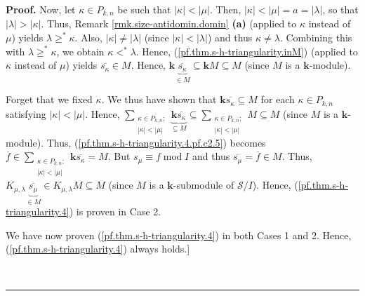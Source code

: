 \documentclass[numbers=enddot,12pt,final,onecolumn,notitlepage]{scrartcl}%
\theoremstyle{definition}
\newenvironment{proof}[1][Proof]{\noindent\textbf{#1.} }{\ \rule{0.5em}{0.5em}}
\let\sumnonlimits\sum
\renewcommand{\sum}{\sumnonlimits\limits}
\begin{document}
\begin{proof}
Now, let $\kappa\in P_{k,n}$ be such that $\left\vert \kappa\right\vert
<\left\vert \mu\right\vert $. Then, $\left\vert \kappa\right\vert <\left\vert
\mu\right\vert =a=\left\vert \lambda\right\vert $, so that $\left\vert
\lambda\right\vert >\left\vert \kappa\right\vert $. Thus, Remark
\ref{rmk.size-antidomin.domin} \textbf{(a)} (applied to $\kappa$ instead of
$\mu$) yields $\lambda\geq^{\ast}\kappa$. Also, $\left\vert \kappa\right\vert
\neq\left\vert \lambda\right\vert $ (since $\left\vert \kappa\right\vert
<\left\vert \lambda\right\vert $) and thus $\kappa\neq\lambda$. Combining this
with $\lambda\geq^{\ast}\kappa$, we obtain $\kappa<^{\ast}\lambda$. Hence,
(\ref{pf.thm.s-h-triangularity.inM}) (applied to $\kappa$ instead of $\mu$)
yields $\overline{s_{\kappa}}\in M$. Hence, $\mathbf{k}\underbrace{\overline
{s_{\kappa}}}_{\in M}\subseteq\mathbf{k}M\subseteq M$ (since $M$ is a
$\mathbf{k}$-module).

Forget that we fixed $\kappa$. We thus have shown that $\mathbf{k}%
\overline{s_{\kappa}}\subseteq M$ for each $\kappa\in P_{k,n}$ satisfying
$\left\vert \kappa\right\vert <\left\vert \mu\right\vert $. Hence,
$\sum_{\substack{\kappa\in P_{k,n};\\\left\vert \kappa\right\vert <\left\vert
\mu\right\vert }}\underbrace{\mathbf{k}\overline{s_{\kappa}}}_{\subseteq
M}\subseteq\sum_{\substack{\kappa\in P_{k,n};\\\left\vert \kappa\right\vert
<\left\vert \mu\right\vert }}M\subseteq M$ (since $M$ is a $\mathbf{k}%
$-module). Thus, (\ref{pf.thm.s-h-triangularity.4.pf.c2.5}) becomes
$\overline{f}\in\sum_{\substack{\kappa\in P_{k,n};\\\left\vert \kappa
\right\vert <\left\vert \mu\right\vert }}\mathbf{k}\overline{s_{\kappa}}=M$.
But $s_{\mu}\equiv f\operatorname{mod}I$ and thus $\overline{s_{\mu}%
}=\overline{f}\in M$. Thus, $K_{\mu,\lambda}\underbrace{\overline{s_{\mu}}%
}_{\in M}\in K_{\mu,\lambda}M\subseteq M$ (since $M$ is a $\mathbf{k}%
$-submodule of $\mathcal{S}/I$). Hence, (\ref{pf.thm.s-h-triangularity.4}) is
proven in Case 2.

We have now proven (\ref{pf.thm.s-h-triangularity.4}) in both Cases 1 and 2.
Hence, (\ref{pf.thm.s-h-triangularity.4}) always holds.]


\end{proof}
\end{document}
